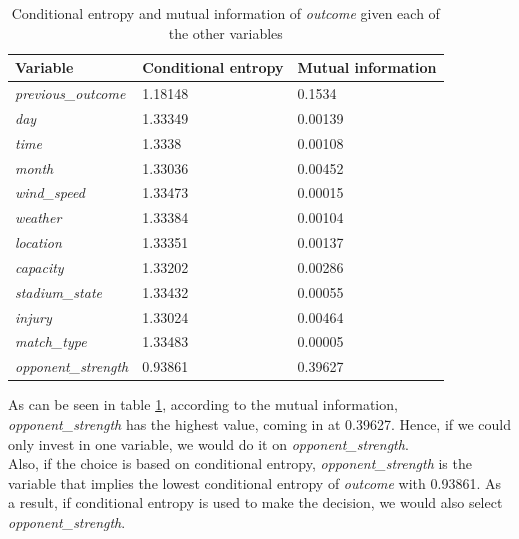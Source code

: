 \documentclass[titlepage]{article}
\begin{document}
\begin{table}[h!]
    \centering
    \small
    \setlength{\tabcolsep}{4pt}
    \begin{tabular}{|p{3cm}|p{4cm}|p{4cm}|}
        \hline 
        \textbf{Variable} & \textbf{Conditional entropy} & \textbf{Mutual information}\\
        \hline
        \textit{previous\_outcome} & 1.18148 & 0.1534\\
        \hline
        \textit{day} & 1.33349 & 0.00139\\
        \hline
        \textit{time} & 1.3338 & 0.00108\\
        \hline
        \textit{month} & 1.33036 & 0.00452\\
        \hline
        \textit{wind\_speed} & 1.33473 & 0.00015\\
        \hline
        \textit{weather} & 1.33384 & 0.00104\\
        \hline
        \textit{location} & 1.33351 & 0.00137\\
        \hline
        \textit{capacity} & 1.33202 & 0.00286\\
        \hline
        \textit{stadium\_state} & 1.33432 & 0.00055\\
        \hline
        \textit{injury} & 1.33024 & 0.00464\\
        \hline
        \textit{match\_type} & 1.33483 & 0.00005\\
        \hline
        \textit{opponent\_strength} & 0.93861 & 0.39627\\
        \hline
    \end{tabular}
    \caption{Conditional entropy and mutual information of 
    \textit{outcome} given each of the other variables}
    \label{tab:q9}
\end{table}

As can be seen in table \ref{tab:q9}, according to the mutual information, \textit{opponent\_strength} has the highest value, coming in at 0.39627. Hence, if we could only invest in one variable, we would do it on \textit{opponent\_strength}.\\ 

Also, if the choice is based on conditional entropy, \textit{opponent\_strength} is the variable that implies the lowest conditional entropy of \textit{outcome} with 0.93861. As a result, if conditional entropy is used to make the decision, we would also select \textit{opponent\_strength}.

\newpage
\end{document}
